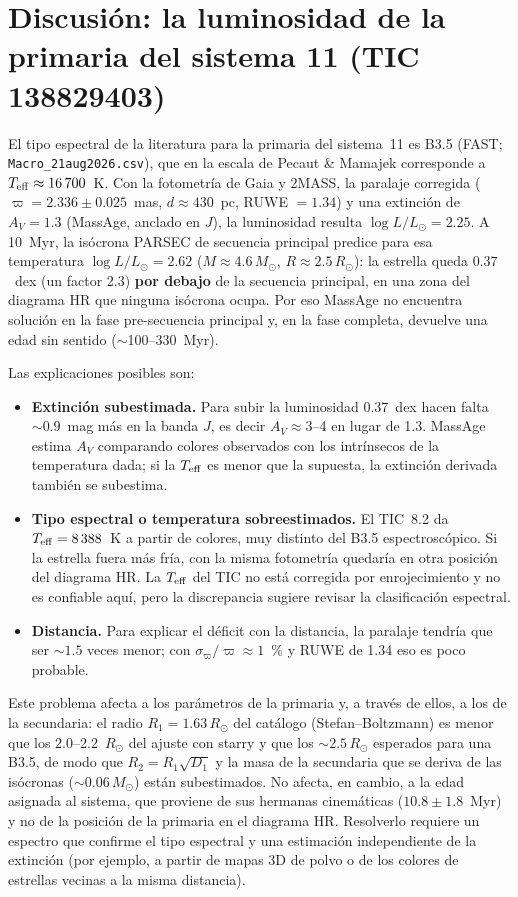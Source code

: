 \section{Discusión: la luminosidad de la primaria del sistema 11 (TIC 138829403)}
\label{sec:sistema11}
El tipo espectral de la literatura para la primaria del sistema~11 es B3.5 (FAST; \texttt{Macro\_21aug2026.csv}),
que en la escala de Pecaut \& Mamajek corresponde a $T_{\rm eff}\approx16\,700$~K. Con la fotometría de Gaia y
2MASS, la paralaje corregida ($\varpi=2.336\pm0.025$~mas, $d\approx430$~pc, RUWE $=1.34$) y una extinción de
$A_V=1.3$ (MassAge, anclado en $J$), la luminosidad resulta $\log L/L_\odot=2.25$. A 10~Myr, la isócrona PARSEC
de secuencia principal predice para esa temperatura $\log L/L_\odot=2.62$ ($M\approx4.6\,M_\odot$,
$R\approx2.5\,R_\odot$): la estrella queda $0.37$~dex (un factor 2.3) \textbf{por debajo} de la secuencia principal,
en una zona del diagrama HR que ninguna isócrona ocupa. Por eso MassAge no encuentra solución en la fase
pre-secuencia principal y, en la fase completa, devuelve una edad sin sentido ($\sim$100--330~Myr).

Las explicaciones posibles son:
\begin{itemize}
\item \textbf{Extinción subestimada.} Para subir la luminosidad 0.37~dex hacen falta $\sim0.9$~mag más en la banda
  $J$, es decir $A_V\approx3$--4 en lugar de 1.3. MassAge estima $A_V$ comparando colores observados con los
  intrínsecos de la temperatura dada; si la $T_{\rm eff}$ es menor que la supuesta, la extinción derivada también
  se subestima.
\item \textbf{Tipo espectral o temperatura sobreestimados.} El TIC~8.2 da $T_{\rm eff}=8\,388$~K a partir de colores,
  muy distinto del B3.5 espectroscópico. Si la estrella fuera más fría, con la misma fotometría quedaría en otra
  posición del diagrama HR. La $T_{\rm eff}$ del TIC no está corregida por enrojecimiento y no es confiable aquí,
  pero la discrepancia sugiere revisar la clasificación espectral.
\item \textbf{Distancia.} Para explicar el déficit con la distancia, la paralaje tendría que ser $\sim1.5$ veces
  menor; con $\sigma_\varpi/\varpi\approx1$~\% y RUWE de 1.34 eso es poco probable.
\end{itemize}

Este problema afecta a los parámetros de la primaria y, a través de ellos, a los de la secundaria: el radio
$R_1=1.63\,R_\odot$ del catálogo (Stefan--Boltzmann) es menor que los 2.0--2.2~$R_\odot$ del ajuste con starry y que
los $\sim2.5\,R_\odot$ esperados para una B3.5, de modo que $R_2=R_1\sqrt{D_1}$ y la masa de la secundaria que se
deriva de las isócronas ($\sim0.06\,M_\odot$) están subestimados. No afecta, en cambio, a la edad asignada al
sistema, que proviene de sus hermanas cinemáticas ($10.8\pm1.8$~Myr) y no de la posición de la primaria en el
diagrama HR. Resolverlo requiere un espectro que confirme el tipo espectral y una estimación independiente de la
extinción (por ejemplo, a partir de mapas 3D de polvo o de los colores de estrellas vecinas a la misma distancia).

